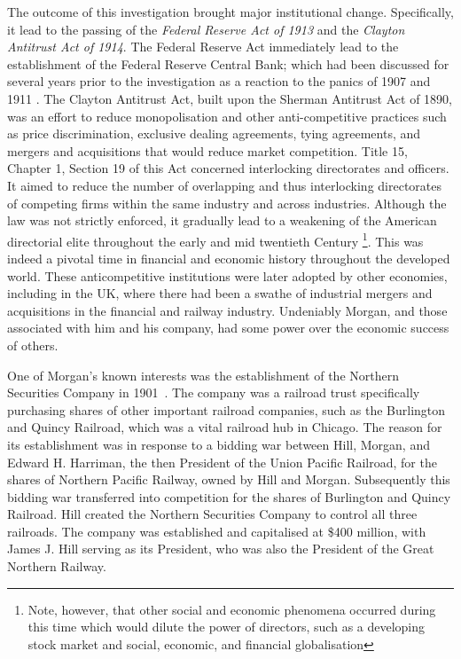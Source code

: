 \documentclass[11pt,fleqn]{article}
\begin{document}
The outcome of this investigation brought major institutional change. Specifically, it lead to the passing of the \emph{Federal Reserve Act of 1913} and the \emph{Clayton Antitrust Act of 1914}. The Federal Reserve Act immediately lead to the establishment of the Federal Reserve Central Bank; which had been discussed for several years prior to the investigation as a reaction to the panics of 1907 and 1911 \citep{Silber2007}. The Clayton Antitrust Act, built upon the Sherman Antitrust Act of 1890, was an effort to reduce monopolisation and other anti-competitive practices such as price discrimination, exclusive dealing agreements, tying agreements, and mergers and acquisitions that would reduce market competition. Title 15, Chapter 1, Section 19 of this Act concerned interlocking directorates and officers. It aimed to reduce the number of overlapping and thus interlocking directorates of competing firms within the same industry and across industries. Although the law was not strictly enforced, it gradually lead to a weakening of the American directorial elite throughout the early and mid twentieth Century \footnote{Note, however, that other social and economic phenomena occurred during this time which would dilute the power of directors, such as a developing stock market and social, economic, and financial globalisation}. This was indeed a pivotal time in financial and economic history throughout the developed world. These anticompetitive institutions were later adopted by other economies, including in the UK, where there had been a swathe of industrial mergers and acquisitions in the financial and railway industry. Undeniably Morgan, and those associated with him and his company, had some power over the economic success of others.

One of Morgan's known interests was the establishment of the Northern Securities Company in 1901~\citep{Langdell1903}. The company was a railroad trust specifically purchasing shares of other important railroad companies, such as the Burlington and Quincy Railroad, which was a vital railroad hub in Chicago. The reason for its establishment was in response to a bidding war between Hill, Morgan, and Edward H. Harriman, the then President of the Union Pacific Railroad, for the shares of Northern Pacific Railway, owned by Hill and Morgan. Subsequently this bidding war transferred into competition for the shares of Burlington and Quincy Railroad. Hill created the Northern Securities Company to control all three railroads. The company was established and capitalised at \$400 million, with James J. Hill serving as its President, who was also the President of the Great Northern Railway.
\end{document}
